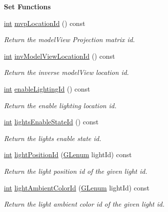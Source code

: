 \begin{Indent}{\bf Set Functions}
\begin{DoxyCompactItemize}
\hyperlink{ioapi_8h_a787fa3cf048117ba7123753c1e74fcd6}{int} \hyperlink{class_g_l_c___shader_aad00d73aece3e598c276dd5199cb308f}{mvp\-Location\-Id} () const 
\begin{DoxyCompactList}\small\item\em Return the model\-View Projection matrix id. \end{DoxyCompactList}\item 
\hyperlink{ioapi_8h_a787fa3cf048117ba7123753c1e74fcd6}{int} \hyperlink{class_g_l_c___shader_a7ba67a7436da1c73a6e48b8e9355852c}{inv\-Model\-View\-Location\-Id} () const 
\begin{DoxyCompactList}\small\item\em Return the inverse model\-View location id. \end{DoxyCompactList}\item 
\hyperlink{ioapi_8h_a787fa3cf048117ba7123753c1e74fcd6}{int} \hyperlink{class_g_l_c___shader_af104e5fda8f77deb9a6c21c059b0691b}{enable\-Lighting\-Id} () const 
\begin{DoxyCompactList}\small\item\em Return the enable lighting location id. \end{DoxyCompactList}\item 
\hyperlink{ioapi_8h_a787fa3cf048117ba7123753c1e74fcd6}{int} \hyperlink{class_g_l_c___shader_a54882f86bf3aa04e318f49241f16c913}{lights\-Enable\-State\-Id} () const 
\begin{DoxyCompactList}\small\item\em Return the lights enable state id. \end{DoxyCompactList}\item 
\hyperlink{ioapi_8h_a787fa3cf048117ba7123753c1e74fcd6}{int} \hyperlink{class_g_l_c___shader_a76a4e6a6a752fa8b4d98c8a3f7b287b6}{light\-Position\-Id} (\hyperlink{glext_8h_a508b2dec21679e2e346cad3e0d1969bf}{G\-Lenum} light\-Id) const 
\begin{DoxyCompactList}\small\item\em Return the light position id of the given light id. \end{DoxyCompactList}\item 
\hyperlink{ioapi_8h_a787fa3cf048117ba7123753c1e74fcd6}{int} \hyperlink{class_g_l_c___shader_a43c89c922734ea50a3f246356a135234}{light\-Ambient\-Color\-Id} (\hyperlink{glext_8h_a508b2dec21679e2e346cad3e0d1969bf}{G\-Lenum} light\-Id) const 
\begin{DoxyCompactList}\small\item\em Return the light ambient color id of the given light id. \end{DoxyCompactList}\item 

\end{DoxyCompactItemize}
\end{Indent}
